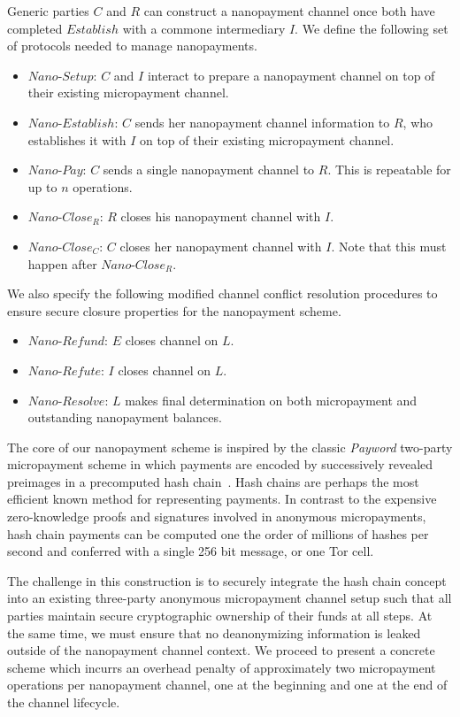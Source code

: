 Generic parties $C$ and $R$ can construct a nanopayment channel once both have
completed $Establish$ with a commone intermediary $I$. We define the following
set of protocols needed to manage nanopayments.

\begin{itemize}
\item $Nano$-$Setup$: $C$ and $I$ interact to prepare a nanopayment channel on top
  of their existing micropayment channel.
\item $Nano$-$Establish$: $C$ sends her nanopayment channel information to $R$,
  who establishes it with $I$ on top of their existing micropayment channel.
\item $Nano$-$Pay$: $C$ sends a single nanopayment channel to $R$. This is
  repeatable for up to $n$ operations.
\item $Nano$-$Close_R$: $R$ closes his nanopayment channel with $I$.
\item $Nano$-$Close_C$: $C$ closes her nanopayment channel with $I$. Note that
  this must happen after $Nano$-$Close_R$.
\end{itemize}

We also specify the following modified channel conflict resolution procedures to
ensure secure closure properties for the nanopayment scheme.

\begin{itemize}
\item $Nano$-$Refund$: $E$ closes channel on $L$.
\item $Nano$-$Refute$: $I$ closes channel on $L$.
\item $Nano$-$Resolve$: $L$ makes final determination on both micropayment and
  outstanding nanopayment balances.
\end{itemize}

The core of our nanopayment scheme is inspired by the classic \emph{Payword}
two-party micropayment scheme in which payments are encoded by successively
revealed preimages in a precomputed hash chain~\cite{rivest1996payword}. Hash
chains are perhaps the most efficient known method for representing payments. In
contrast to the expensive zero-knowledge proofs and signatures involved in
anonymous micropayments, hash chain payments can be computed one the order of
millions of hashes per second and conferred with a single 256 bit message, or
one Tor cell.

The challenge in this construction is to securely integrate the hash chain
concept into an existing three-party anonymous micropayment channel setup such
that all parties maintain secure cryptographic ownership of their funds at all
steps. At the same time, we must ensure that no deanonymizing information is
leaked outside of the nanopayment channel context. We proceed to present a
concrete scheme which incurrs an overhead penalty of approximately two
micropayment operations per nanopayment channel, one at the beginning and one at
the end of the channel lifecycle.

